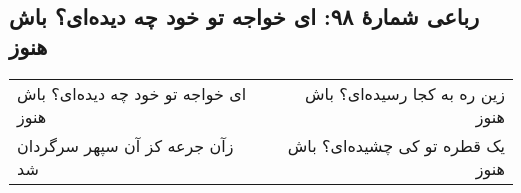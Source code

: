 \begin{center}
\section*{رباعی شمارهٔ ۹۸: ای خواجه تو خود چه دیده‌ای؟ باش هنوز}
\label{sec:098}
\begin{longtable}{l p{0.5cm} r}
ای خواجه تو خود چه دیده‌ای؟ باش هنوز
&&
زین ره به کجا رسیده‌ای؟ باش هنوز
\\
زآن جرعه کز آن سپهر سرگردان شد
&&
یک قطره تو کی چشیده‌ای؟ باش هنوز
\\
\end{longtable}
\end{center}
